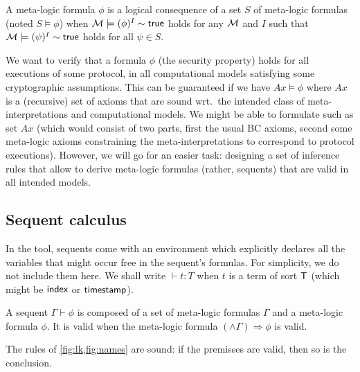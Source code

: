 \begin{definition}
  A meta-logic formula $\phi$ is a
  logical consequence of a set $S$ of meta-logic formulas
  (noted $S \models \phi$)
  when
  $\mathcal{M}\models(\phi)^I\sim\mathsf{true}$ holds for any $\mathcal{M}$ and $I$ such that
  $\mathcal{M}\models(\psi)^I\sim\mathsf{true}$ holds for all $\psi\in S$.
\end{definition}

We want to verify that a formula $\phi$ (the security property)
holds for all executions of some protocol, in all computational models
satisfying some cryptographic assumptions.
This can be guaranteed if we have $Ax\models\phi$
where $Ax$ is a (recursive) set of axioms that are sound
wrt.\ the intended class of meta-interpretations and computational models.
We might be able to formulate such as set $Ax$ (which would consist of
two parts, first the usual BC axioms, second some meta-logic axioms 
constraining the meta-interpretations to correspond to protocol executions).
However, we will go for an easier task: designing a set of inference
rules that allow to derive meta-logic formulas (rather, sequents)
that are valid in all intended models.

\subsection{Sequent calculus}

In the tool, sequents come with an environment which explicitly
declares all the variables that might occur free in the sequent's formulas.
For simplicity, we do not include them here. We shall write $\vdash t:T$
when $t$ is a term of sort $\textsf{T}$ (which might be $\textsf{index}$ or $\textsf{timestamp}$).

\begin{definition}
  A sequent $\Gamma \vdash \phi$ is composed of a set of meta-logic formulas
  $\Gamma$ and a meta-logic formula $\phi$.
  It is valid when the meta-logic formula
  $(\wedge\Gamma) \Rightarrow \phi$ is valid.
\end{definition}

\begin{proposition}
  The rules of \cref{fig:lk,fig:names} are sound: if the premisses are valid,
  then so is the conclusion.
\end{proposition}

